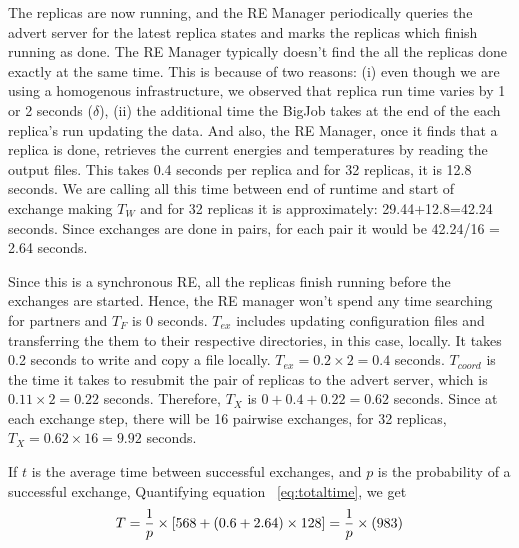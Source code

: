 \documentclass{rspublic}
\newcommand{\alnote}[1]{ {\textcolor{blue} { ***andre: #1 }}}
\newcommand{\alnote}[1]{}
\begin{document}
The replicas are now running, and the RE Manager periodically queries the advert server for the latest replica states and marks the replicas which finish running as done. The RE Manager typically doesn't find the all the replicas done exactly at the same time. This is because of two reasons: (i) even though we are using  a homogenous infrastructure, we observed that replica run time varies by 1 or 2 seconds ($\delta$), (ii) the additional time the BigJob takes at the end of the each replica's run updating the data. And also, the RE Manager, once it finds that a replica is done, retrieves the current energies and temperatures by reading the output files. This takes 0.4 seconds per replica and for 32 replicas, it is 12.8 seconds. 
We are calling all this time between end of runtime and start of exchange making $T_W$ and for 32 replicas it is approximately: 29.44+12.8=42.24 seconds. Since exchanges are done in pairs, for each pair it would be 42.24/16 = 2.64 seconds.

Since this is a synchronous RE, all the replicas finish running before the exchanges are started. Hence, the RE manager won't spend any time searching for partners and $T_F$ is 0 seconds. $T_{ex}$ includes updating configuration files and transferring the them to their respective directories, in this case, locally. It takes 0.2 seconds to write and copy a file locally. $T_{ex} = 0.2 \times 2=0.4$ seconds. $T_{coord}$ is the time it takes to resubmit the pair of replicas to the advert server, which is $0.11\times 2 = 0.22$ seconds. Therefore, $T_X$ is $0+0.4+0.22=0.62$ seconds. Since at each exchange step, there will be 16 pairwise exchanges, for 32 replicas, $T_X=0.62 \times 16 = 9.92$ seconds.

If $t$ is the average time between successful exchanges, and $p$ is the probability of a successful exchange, 
Quantifying equation ~\ref{eq:totaltime}, we get
\begin{eqnarray}
T=  {1 \over p} \times {[ 568+ (0.6 + 2.64)\times 128]} = {1 \over p} \times (983)
\label{eq:timebt}
\end{eqnarray}


\end{document}

